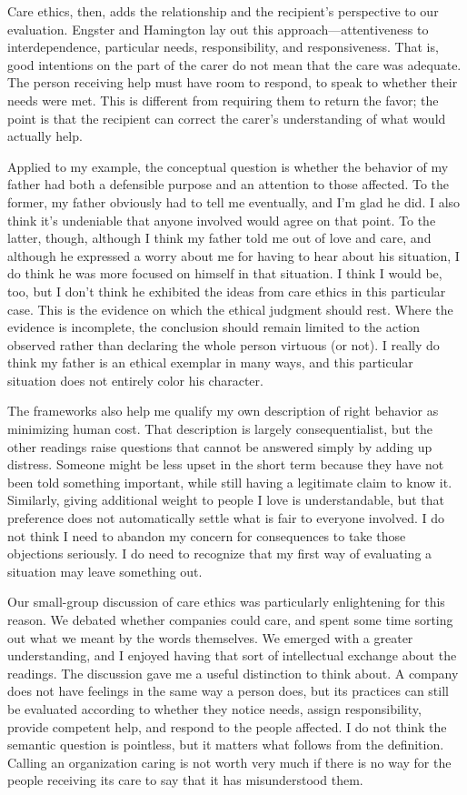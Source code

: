 \documentclass[12pt,stu,biblatex]{apa7}
\begin{document}
Care ethics, then, adds the relationship and the recipient's perspective to our evaluation.
Engster and Hamington \parencite{engsterHamington2015introduction} lay out this approach---attentiveness to interdependence, particular needs, responsibility, and responsiveness.
That is, good intentions on the part of the carer do not mean that the care was adequate.
The person receiving help must have room to respond, to speak to whether their needs were met.
This is different from requiring them to return the favor; the point is that the recipient can correct the carer's understanding of what would actually help.

Applied to my example, the conceptual question is whether the behavior of my father had both a defensible purpose and an attention to those affected.
To the former, my father obviously had to tell me eventually, and I'm glad he did.
I also think it's undeniable that anyone involved would agree on that point.
To the latter, though, although I think my father told me out of love and care, and although he expressed a worry about me for having to hear about his situation, I do think he was more focused on himself in that situation.
I think I would be, too, but I don't think he exhibited the ideas from care ethics in this particular case.
This is the evidence on which the ethical judgment should rest.
Where the evidence is incomplete, the conclusion should remain limited to the action observed rather than declaring the whole person virtuous (or not).
I really do think my father is an ethical exemplar in many ways, and this particular situation does not entirely color his character.

The frameworks also help me qualify my own description of right behavior as minimizing human cost.
That description is largely consequentialist, but the other readings raise questions that cannot be answered simply by adding up distress.
Someone might be less upset in the short term because they have not been told something important, while still having a legitimate claim to know it.
Similarly, giving additional weight to people I love is understandable, but that preference does not automatically settle what is fair to everyone involved.
I do not think I need to abandon my concern for consequences to take those objections seriously.
I do need to recognize that my first way of evaluating a situation may leave something out.

Our small-group discussion of care ethics was particularly enlightening for this reason.
We debated whether companies could care, and spent some time sorting out what we meant by the words themselves.
We emerged with a greater understanding, and I enjoyed having that sort of intellectual exchange about the readings.
The discussion gave me a useful distinction to think about.
A company does not have feelings in the same way a person does, but its practices can still be evaluated according to whether they notice needs, assign responsibility, provide competent help, and respond to the people affected.
I do not think the semantic question is pointless, but it matters what follows from the definition.
Calling an organization caring is not worth very much if there is no way for the people receiving its care to say that it has misunderstood them.
\end{document}
